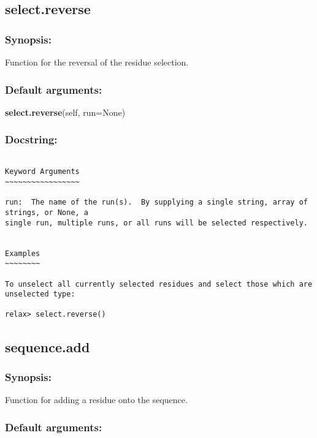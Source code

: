 \newpage

\subsection{select.reverse}


\subsubsection{Synopsis:}

Function for the reversal of the residue selection.

\subsubsection{Default arguments:}

\textsf{\textbf{select.reverse}(self, run=None)
}


\subsubsection{Docstring:}

{\scriptsize
\begin{verbatim}

Keyword Arguments
~~~~~~~~~~~~~~~~~

run:  The name of the run(s).  By supplying a single string, array of strings, or None, a
single run, multiple runs, or all runs will be selected respectively.


Examples
~~~~~~~~

To unselect all currently selected residues and select those which are unselected type:

relax> select.reverse()
\end{verbatim}
}



\newpage

\subsection{sequence.add}


\subsubsection{Synopsis:}

Function for adding a residue onto the sequence.

\subsubsection{Default arguments:}


